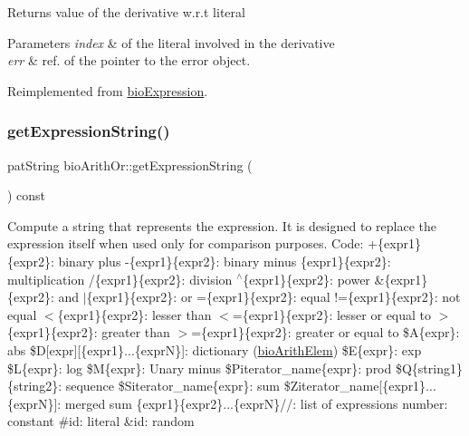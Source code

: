 \begin{DoxyReturn}{Returns}
value of the derivative w.\+r.\+t literal 
\end{DoxyReturn}

\begin{DoxyParams}{Parameters}
{\em index} & of the literal involved in the derivative \\
\hline
{\em err} & ref. of the pointer to the error object. \\
\hline
\end{DoxyParams}


Reimplemented from \hyperlink{classbio_expression_a5915579d1193f25f216c1e273c97f2ce}{bio\+Expression}.

\mbox{\label{classbio_arith_or_aa31f4d5e3b2ac7df4c52b55f51819589}} 
\subsubsection{\texorpdfstring{get\+Expression\+String()}{getExpressionString()}}
{\footnotesize\ttfamily pat\+String bio\+Arith\+Or\+::get\+Expression\+String (\begin{DoxyParamCaption}{ }\end{DoxyParamCaption}) const\hspace{0.3cm}{\ttfamily [virtual]}}

Compute a string that represents the expression. It is designed to replace the expression itself when used only for comparison purposes. Code\+: +\{expr1\}\{expr2\}\+: binary plus -\/\{expr1\}\{expr2\}\+: binary minus \{expr1\}\{expr2\}\+: multiplication /\{expr1\}\{expr2\}\+: division $^\wedge$\{expr1\}\{expr2\}\+: power \&\{expr1\}\{expr2\}\+: and $\vert$\{expr1\}\{expr2\}\+: or =\{expr1\}\{expr2\}\+: equal !=\{expr1\}\{expr2\}\+: not equal $<$\{expr1\}\{expr2\}\+: lesser than $<$=\{expr1\}\{expr2\}\+: lesser or equal to $>$\{expr1\}\{expr2\}\+: greater than $>$=\{expr1\}\{expr2\}\+: greater or equal to \$A\{expr\}\+: abs \$D\mbox{[}expr\mbox{]}\mbox{[}\{expr1\}...\{exprN\}\mbox{]}\+: dictionary (\hyperlink{classbio_arith_elem}{bio\+Arith\+Elem}) \$E\{expr\}\+: exp \$L\{expr\}\+: log \$M\{expr\}\+: Unary minus \$\+Piterator\+\_\+name\{expr\}\+: prod \$Q\{string1\}\{string2\}\+: sequence \$\+Siterator\+\_\+name\{expr\}\+: sum \$\+Ziterator\+\_\+name\mbox{[}\{expr1\}...\{exprN\}\mbox{]}\+: merged sum \{expr1\}\{expr2\}...\{exprN\}//\+: list of expressions number\+: constant \#id\+: literal \&id\+: random 

